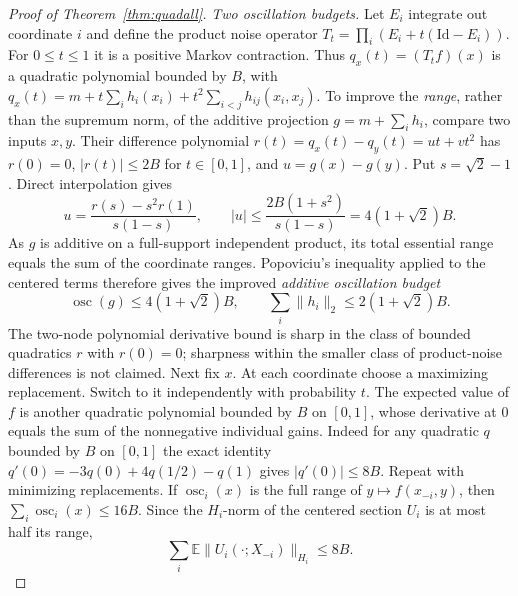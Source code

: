 \documentclass[11pt]{article}
\numberwithin{equation}{section}
\theoremstyle{remark}
\newcommand{\E}{\mathbb E}
\newcommand{\Aquad}{2(1+\sqrt2)}
\begin{document}
\begin{proof}[Proof of Theorem~\ref{thm:quadall}]
\emph{Two oscillation budgets.} Let $E_i$ integrate out coordinate $i$ and define the product noise operator $T_t=\prod_i(E_i+t(\mathrm{Id}-E_i))$. For $0\le t\le1$ it is a positive Markov contraction. Thus $q_x(t)=(T_tf)(x)$ is a quadratic polynomial bounded by $B$, with
$q_x(t)=m+t\sum_i h_i(x_i)+t^2\sum_{i<j}h_{ij}(x_i,x_j)$.
To improve the \emph{range}, rather than the supremum norm, of the additive projection $g=m+\sum_i h_i$, compare two inputs $x,y$. Their difference polynomial $r(t)=q_x(t)-q_y(t)=ut+vt^2$ has $r(0)=0$, $|r(t)|\le2B$ for $t\in[0,1]$, and $u=g(x)-g(y)$. Put $s=\sqrt2-1$. Direct interpolation gives
\[
 u=\frac{r(s)-s^2r(1)}{s(1-s)},\qquad
 |u|\le\frac{2B(1+s^2)}{s(1-s)}=4(1+\sqrt2)B.
\]
As $g$ is additive on a full-support independent product, its total essential range equals the sum of the coordinate ranges. Popoviciu's inequality applied to the centered terms therefore gives the improved \emph{additive oscillation budget}
\begin{equation}\label{eq:qadd}
 \operatorname{osc}(g)\le4(1+\sqrt2)B,\qquad
 \sum_i\|h_i\|_2\le\Aquad B.
\end{equation}
The two-node polynomial derivative bound is sharp in the class of bounded quadratics $r$ with $r(0)=0$; sharpness within the smaller class of product-noise differences is not claimed.
Next fix $x$. At each coordinate choose a maximizing replacement. Switch to it independently with probability $t$. The expected value of $f$ is another quadratic polynomial bounded by $B$ on $[0,1]$, whose derivative at $0$ equals the sum of the nonnegative individual gains. Indeed for any quadratic $q$ bounded by $B$ on $[0,1]$ the exact identity $q'(0)=-3q(0)+4q(1/2)-q(1)$ gives $|q'(0)|\le8B$. Repeat with minimizing replacements. If $\operatorname{osc}_i(x)$ is the full range of $y\mapsto f(x_{-i},y)$, then $\sum_i\operatorname{osc}_i(x)\le16B$. Since the $H_i$-norm of the centered section $U_i$ is at most half its range,
\begin{equation}\label{eq:qosc}
 \sum_i\E\|U_i(\cdot;X_{-i})\|_{H_i}\le8B.
\end{equation}


\end{proof}
\end{document}

